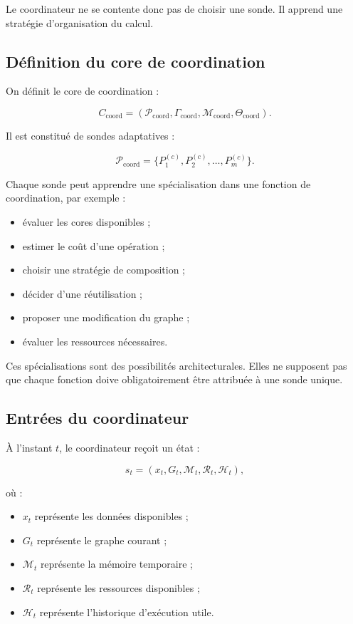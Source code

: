 \documentclass[11pt,a4paper]{article}
\begin{document}
Le coordinateur ne se contente donc pas de choisir une sonde.
Il apprend une stratégie d'organisation du calcul.

\subsection{Définition du core de coordination}

On définit le core de coordination :

\[
C_{\mathrm{coord}}
=
\left(
\mathcal{P}_{\mathrm{coord}},
\Gamma_{\mathrm{coord}},
\mathcal{M}_{\mathrm{coord}},
\Theta_{\mathrm{coord}}
\right).
\]

Il est constitué de sondes adaptatives :

\[
\mathcal{P}_{\mathrm{coord}}
=
\{
P_1^{(c)},P_2^{(c)},\ldots,P_m^{(c)}
\}.
\]

Chaque sonde peut apprendre une spécialisation dans une fonction
de coordination, par exemple :
\begin{itemize}
  \item évaluer les cores disponibles ;
  \item estimer le coût d'une opération ;
  \item choisir une stratégie de composition ;
  \item décider d'une réutilisation ;
  \item proposer une modification du graphe ;
  \item évaluer les ressources nécessaires.
\end{itemize}

Ces spécialisations sont des possibilités architecturales.
Elles ne supposent pas que chaque fonction doive obligatoirement
être attribuée à une sonde unique.

\subsection{Entrées du coordinateur}

À l'instant $t$, le coordinateur reçoit un état :

\[
s_t =
(x_t,G_t,\mathcal{M}_t,\mathcal{R}_t,\mathcal{H}_t),
\]

où :

\begin{itemize}
  \item $x_t$ représente les données disponibles ;
  \item $G_t$ représente le graphe courant ;
  \item $\mathcal{M}_t$ représente la mémoire temporaire ;
  \item $\mathcal{R}_t$ représente les ressources disponibles ;
  \item $\mathcal{H}_t$ représente l'historique d'exécution utile.
\end{itemize}
\end{document}
